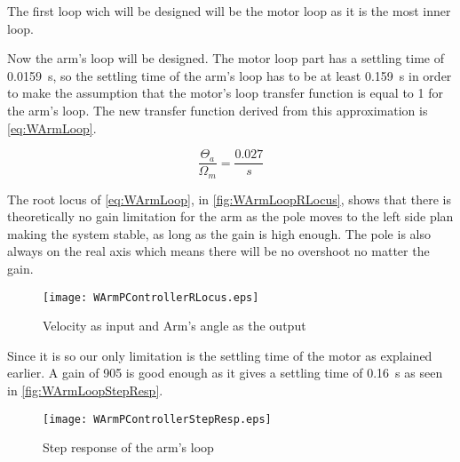 The first loop wich will be designed will be the motor loop as it is the most inner loop.

%

Now the arm's loop will be designed. The motor loop part has a settling time of \SI{0.0159}{\second}, so the settling time of the arm's loop has to be at least \SI{0.159}{\second} in order to make the assumption that the motor's loop transfer function is equal to 1 for the arm's loop. The new transfer function derived from this approximation is \autoref{eq:WArmLoop}.

\begin{equation}\label{eq:WArmLoop}
	\frac{\Theta_a}{\Omega_m}=\frac{0.027}{s}
\end{equation}

The root locus of \autoref{eq:WArmLoop}, in \autoref{fig:WArmLoopRLocus}, shows that there is theoretically no gain limitation for the arm as the pole moves to the left side plan making the system stable, as long as the gain is high enough. The pole is also always on the real axis which means there will be no overshoot no matter the gain.

\begin{figure} [htbp] 
	\centering
	\texttt{[image: WArmPControllerRLocus.eps]}
	\caption{Velocity as input and Arm's angle as the output}
	\label{fig:WArmLoopRLocus}
\end{figure}

Since it is so our only limitation is the settling time of the motor as explained earlier. A gain of 905 is good enough as it gives a settling time of \SI{0.16}{\second} as seen in \autoref{fig:WArmLoopStepResp}.

\begin{figure} [htbp] 
	\centering
	\texttt{[image: WArmPControllerStepResp.eps]}
	\caption{Step response of the arm's loop}
	\label{fig:WArmLoopStepResp}
\end{figure}




